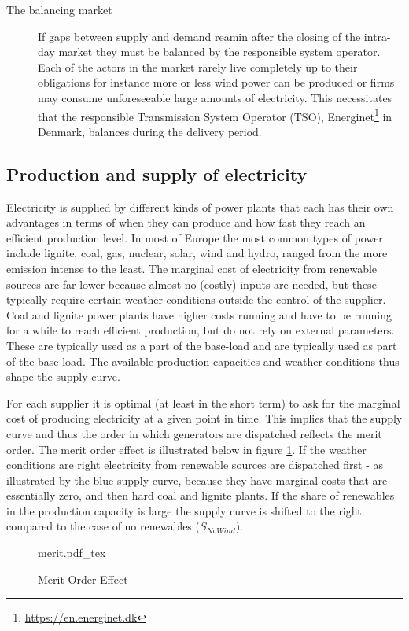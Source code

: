 \begin{description}
    \item [The balancing market]
    If gaps between supply and demand reamin after the closing of the intra-day market they must be balanced by the responsible system operator. Each of the actors in the market rarely live completely up to their obligations for instance more or less wind power can be produced or firms may consume unforeseeable large amounts of electricity. This necessitates that the responsible Transmission System Operator (TSO), Energinet\footnote{\url{https://en.energinet.dk}} in Denmark, balances during the delivery period. %


\end{description}


\subsection{Production and supply of electricity}
\label{subsec:t_production}
Electricity is supplied by different kinds of power plants that each has their own advantages in terms of when they can produce and how fast they reach an efficient production level. In most of Europe the most common types of power include lignite, coal, gas, nuclear, solar, wind and hydro, ranged from the more emission intense to the least. The marginal cost of electricity from renewable sources are far lower because almost no (costly) inputs are needed, but these typically require certain weather conditions outside the control of the supplier. Coal and lignite power plants have higher costs running and have to be running for a while to reach efficient production, but do not rely on external parameters. These are typically used as a part of the base-load  and are typically used as part of the base-load. The available production capacities and weather conditions thus shape the supply curve.
\medskip 

For each supplier it is optimal (at least in the short term) to ask for the marginal cost of producing electricity at a given point in time. This implies that the supply curve and thus the order in which generators are dispatched reflects the merit order. The merit order effect is illustrated below in figure \ref{fig:merit}. If the weather conditions are right electricity from renewable sources are dispatched first - as illustrated by the blue supply curve, because they have marginal costs that are essentially zero, and then hard coal and lignite plants. If the share of renewables in the production capacity is large the supply curve is shifted to the right compared to the case of no renewables ($S_{NoWind}$).
\medskip 
\begin{figure}[H]
    \centering
    \caption{Merit Order Effect}
    \label{fig:merit}
    \center
        \def\svgwidth{0.9\textwidth}
        {merit.pdf_tex}
\end{figure}

